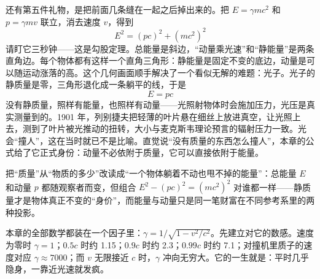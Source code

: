 \begin{mainline}
还有第五件礼物，是把前面几条缝在一起之后掉出来的。把 \(E=\gamma mc^{2}\) 和 \(p=\gamma mv\) 联立，消去速度 \(v\)，得到
\[
E^{2}=(pc)^{2}+(mc^{2})^{2}
\]
请盯它三秒钟——这是勾股定理。总能量是斜边，“动量乘光速”和“静能量”是两条直角边。每个物体都有这样一个直角三角形：静能量是固定不变的底边，动量是可以随运动涨落的高。这个几何画面顺手解决了一个看似无解的难题：光子。光子的静质量是零，三角形退化成一条躺平的线，于是
\[
E=pc
\]
没有静质量，照样有能量，也照样有动量——光照射物体时会施加压力，光压是真实测量到的。1901 年，列别捷夫把轻薄的叶片悬在细丝上放进真空，让光照上去，测到了叶片被光推动的扭转，大小与麦克斯韦理论预言的辐射压力一致。光会“撞人”，这在当时就已不是比喻。直觉说“没有质量的东西怎么撞人”，本章的公式给了它正式身份：动量不必依附于质量，它可以直接依附于能量。
\end{mainline}


\begin{oneline}
把“质量”从“物质的多少”改读成“一个物体躺着不动也甩不掉的能量”：总能量 \(E\) 和动量 \(p\) 都随观察者而变，但组合 \(E^{2}-(pc)^{2}=(mc^{2})^{2}\) 对谁都一样——静质量才是物体真正不变的“身价”，而能量与动量只是同一笔财富在不同参考系里的两种投影。
\end{oneline}


\begin{mainline}
本章的全部数学都装在一个因子里：\(\gamma=1/\sqrt{1-v^{2}/c^{2}}\)。先建立对它的数感。速度为零时 \(\gamma=1\)；\(0.5c\) 时约 1.15；\(0.9c\) 时约 2.3；\(0.99c\) 时约 7.1；对撞机里质子的速度对应 \(\gamma\approx7000\)；而 \(v\) 无限接近 \(c\) 时，\(\gamma\) 冲向无穷大。它的一生就是：平时几乎隐身，一靠近光速就发疯。
\end{mainline}

\begin{center}
\end{center}


